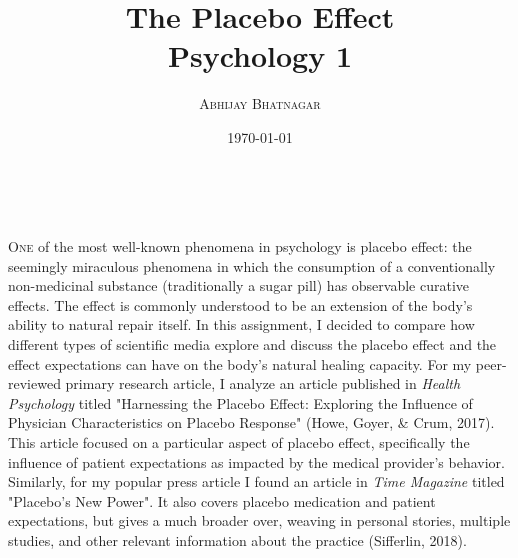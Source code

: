 \documentclass[a4paper, 10pt]{article}
\title{\textbf{The Placebo Effect}
\\ Psychology 1}
\author{\textsc{Abhijay Bhatnagar}}
\date{\today}
\makeatletter
\renewcommand{\maketitle}{
\begin{flushright}
{\LARGE\@title}

\vspace{0pt}

{\large\@author}
\\\@date

\vspace{0pt}
\end{flushright}
}
\makeatother
\begin{document}
\maketitle
\lettrine{O}{ne} of the most well-known phenomena in psychology is placebo effect: the seemingly miraculous phenomena in which the consumption of a conventionally non-medicinal substance (traditionally a sugar pill) has observable curative effects. The effect is commonly understood to be an extension of the body's ability to natural repair itself. In this assignment, I decided to compare how different types of scientific media explore and discuss the placebo effect and the effect expectations
 can have on the body's natural healing capacity. For my peer-reviewed primary research article, I analyze an article published in \textit{Health Psychology} titled "Harnessing the Placebo Effect: Exploring the Influence of Physician Characteristics on Placebo Response" (Howe, Goyer, \& Crum, 2017). This article focused on a particular aspect of placebo effect, specifically the influence of patient expectations as impacted by the medical provider's behavior. Similarly, for my popular press article I found an article in \textit{Time
 Magazine} titled "Placebo's New Power". It also covers placebo medication and patient expectations, but gives a much broader over, weaving in personal stories, multiple studies, and other relevant information about the practice (Sifferlin, 2018). 
\end{document}
